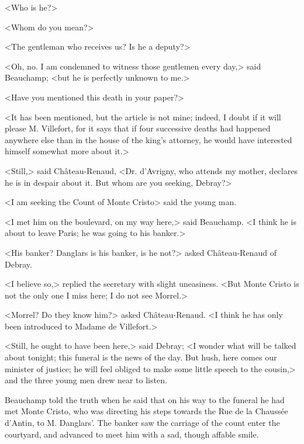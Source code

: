 <Who is he?> 

 <Whom do you mean?> 

 <The gentleman who receives us? Is he a deputy?> 

 <Oh, no. I am condemned to witness those gentlemen every day,> said Beauchamp; <but he is perfectly unknown to me.> 

 <Have you mentioned this death in your paper?> 

 <It has been mentioned, but the article is not mine; indeed, I doubt if it will please M. Villefort, for it says that if four successive deaths had happened anywhere else than in the house of the king's attorney, he would have interested himself somewhat more about it.> 

 <Still,> said Château-Renaud, <Dr. d'Avrigny, who attends my mother, declares he is in despair about it. But whom are you seeking, Debray?> 

 <I am seeking the Count of Monte Cristo> said the young man. 

 <I met him on the boulevard, on my way here,> said Beauchamp. <I think he is about to leave Paris; he was going to his banker.> 

 <His banker? Danglars is his banker, is he not?> asked Château-Renaud of Debray. 

 <I believe so,> replied the secretary with slight uneasiness. <But Monte Cristo is not the only one I miss here; I do not see Morrel.> 

 <Morrel? Do they know him?> asked Château-Renaud. <I think he has only been introduced to Madame de Villefort.> 

 <Still, he ought to have been here,> said Debray; <I wonder what will be talked about tonight; this funeral is the news of the day. But hush, here comes our minister of justice; he will feel obliged to make some little speech to the cousin,> and the three young men drew near to listen. 

 Beauchamp told the truth when he said that on his way to the funeral he had met Monte Cristo, who was directing his steps towards the Rue de la Chaussée d'Antin, to M. Danglars'. The banker saw the carriage of the count enter the courtyard, and advanced to meet him with a sad, though affable smile. 

